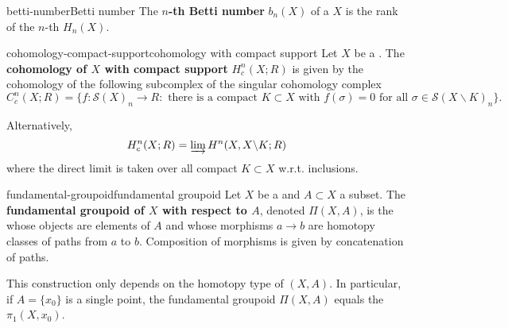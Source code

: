 \begin{topic}{betti-number}{Betti number}
    The \textbf{$n$-th Betti number} $b_n(X)$ of a  $X$ is the rank of the $n$-th  $H_n(X)$.
\end{topic}

\begin{topic}{cohomology-compact-support}{cohomology with compact support}
    Let $X$ be a . The \textbf{cohomology of $X$ with compact support} $H_c^n(X; R)$ is given by the cohomology of the following subcomplex of the singular cohomology complex
    \[ C_c^n(X; R) = \big\{ f : \mathcal{S}(X)_n \to R : \text{ there is a compact $K \subset X$ with $f(\sigma) = 0$ for all $\sigma \in \mathcal{S}(X \backslash K)_n$} \big\} . \]
    
    Alternatively,
    \[ H_c^n(X; R) = \varinjlim H^n(X, X \backslash K; R) \]
    where the direct limit is taken over all compact $K \subset X$ w.r.t. inclusions.
\end{topic}

\begin{topic}{fundamental-groupoid}{fundamental groupoid}
    Let $X$ be a  and $A \subset X$ a subset. The \textbf{fundamental groupoid of $X$ with respect to $A$}, denoted $\Pi(X, A)$, is the  whose objects are elements of $A$ and whose morphisms $a \to b$ are homotopy classes of paths from $a$ to $b$. Composition of morphisms is given by concatenation of paths.
    
    This construction only depends on the homotopy type of $(X, A)$. In particular, if $A = \{ x_0 \}$ is a single point, the fundamental groupoid $\Pi(X, A)$ equals the  $\pi_1(X, x_0)$.
\end{topic}

